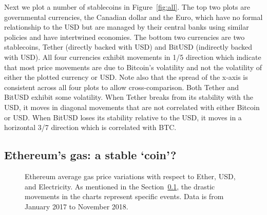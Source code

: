 Next we plot a number of stablecoins in Figure~\ref{fig:all}. The top two plots are governmental currencies, the Canadian dollar and the Euro, which have no formal relationship to the USD but are managed by their central banks using similar policies and have intertwined economies. The bottom two currencies are two stablecoins, Tether (directly backed with USD) and BitUSD (indirectly backed with USD). All four currencies exhibit movements in 1/5 direction which indicate that most price movements are due to Bitcoin's volatility and not the volatility of either the plotted currency or USD. Note also that the spread of the x-axis is consistent across all four plots to allow cross-comparison. Both Tether and BitUSD exhibit some volatility. When Tether breaks from its stability with the USD, it moves in diagonal movements that are not correlated with either Bitcoin or USD. When BitUSD loses its stability relative to the USD, it moves in a horizontal 3/7 direction which is correlated with BTC.


\subsection {Ethereum's gas: a stable `coin'?}\label{sec:GasInvs}

\begin{figure}[t]
	\centering
	\hfill
	\caption {Ethereum average gas price variations with respect to Ether, USD, and Electricity. As mentioned in the Section~\ref{sec:GasInvs}, the drastic movements in the charts represent specific events. Data is from January 2017 to November 2018.}
	\label{fig:gas}
\end{figure}

